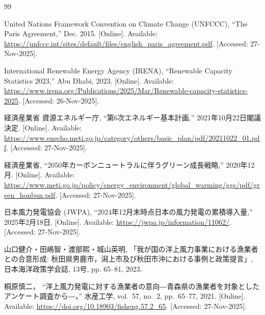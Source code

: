 \begin{thebibliography}{99}
\sloppy


United Nations Framework Convention on Climate Change (UNFCCC), ``The Paris Agreement,'' Dec. 2015. [Online]. Available: \url{https://unfccc.int/sites/default/files/english_paris_agreement.pdf}. [Accessed: 27-Nov-2025].

International Renewable Energy Agency (IRENA), ``Renewable Capacity Statistics 2023,'' Abu Dhabi, 2023. [Online]. Available: \url{https://www.irena.org/Publications/2025/Mar/Renewable-capacity-statistics-2025}. [Accessed: 26-Nov-2025].

経済産業省 資源エネルギー庁, ``第6次エネルギー基本計画,'' 2021年10月22日閣議決定. [Online]. Available: \url{https://www.enecho.meti.go.jp/category/others/basic_plan/pdf/20211022_01.pdf}. [Accessed: 27-Nov-2025].

経済産業省, ``2050年カーボンニュートラルに伴うグリーン成長戦略,'' 2020年12月. [Online]. Available: \url{https://www.meti.go.jp/policy/energy_environment/global_warming/ggs/pdf/green_honbun.pdf}. [Accessed: 27-Nov-2025].

日本風力発電協会 (JWPA), ``2024年12月末時点日本の風力発電の累積導入量,'' 2025年2月18日. [Online]. Available: \url{https://jwpa.jp/information/11062/}. [Accessed: 27-Nov-2025].

山口健介・田嶋智・渡部熙・城山英明, 「我が国の洋上風力事業における漁業者との合意形成: 秋田県男鹿市，潟上市及び秋田市沖における事例と政策提言」, 日本海洋政策学会誌, 13号, pp. 65--81, 2023.

桐原慎二，
``洋上風力発電に対する漁業者の意向―青森県の漁業者を対象としたアンケート調査から―，''
水産工学, vol.~57, no.~2, pp.~65--77, 2021.
[Online]. Available: \url{https://doi.org/10.18903/fisheng.57.2_65}.
[Accessed: 27-Nov-2025].


\end{thebibliography}
